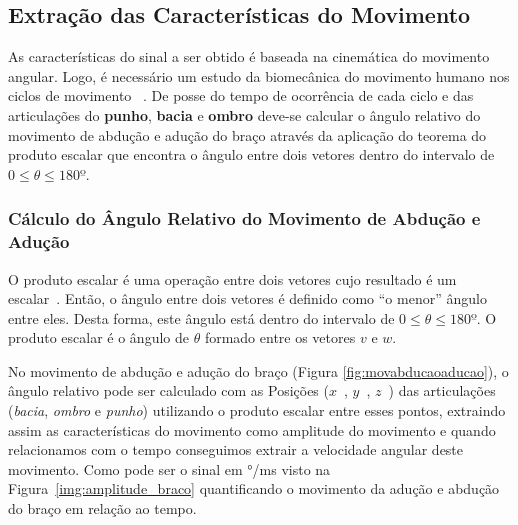 \subsection{Extração das Características do Movimento} \label{sec:extracao_caracteristcas}
As características do sinal a ser obtido é baseada na cinemática do movimento angular. Logo, é necessário um estudo da biomecânica do movimento humano nos ciclos de movimento ~\cite{hamill1999bases}. De posse do tempo de ocorrência de cada ciclo e das articulações do \textbf{punho}, \textbf{bacia} e \textbf{ombro} deve-se calcular o ângulo relativo do movimento de abdução e adução do braço através da aplicação do teorema do produto escalar que encontra o ângulo entre dois vetores dentro do intervalo de $0 \leq \theta \leq 180º$.

\subsubsection{Cálculo do Ângulo Relativo do Movimento de Abdução e Adução}\label{section:movimento_abducao}
O produto escalar é uma operação entre dois vetores cujo resultado é um escalar~\cite{algebra90}. Então, o ângulo entre dois vetores é definido como ``o menor'' ângulo entre eles. Desta forma, este ângulo está dentro do intervalo de $0 \leq \theta \leq 180º $. O produto escalar é o ângulo de $ \theta$ formado entre os vetores $ v $ e $ w $.


% 
% 

No movimento de abdução e adução do braço (Figura \ref{fig:movabducaoaducao}), o ângulo relativo pode ser calculado com as Posições ($ x $\ ,  $ y $\ , $ z $\ ) das articulações (\textit{bacia}, \textit{ombro} e \textit{punho}) utilizando o produto escalar entre esses pontos, extraindo assim as características do movimento como amplitude do movimento e quando relacionamos com o tempo conseguimos extrair a velocidade angular deste movimento. Como pode ser o sinal em °/ms visto na Figura~\ref{img:amplitude_braco} quantificando o movimento da adução e abdução do braço em relação ao tempo.

